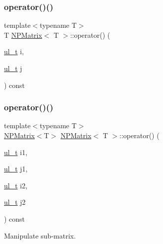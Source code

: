 \subsubsection{\texorpdfstring{operator()()}{operator()()}\hspace{0.1cm}{\footnotesize\ttfamily [2/4]}}
{\footnotesize\ttfamily template$<$typename T$>$ \\
T \mbox{\hyperlink{class_n_p_matrix}{N\+P\+Matrix}}$<$ T $>$\+::operator() (\begin{DoxyParamCaption}\item[{\mbox{\hyperlink{typedef_8h_a1b140a2034db3f5dfe18a987745df43a}{ul\+\_\+t}}}]{i,  }\item[{\mbox{\hyperlink{typedef_8h_a1b140a2034db3f5dfe18a987745df43a}{ul\+\_\+t}}}]{j }\end{DoxyParamCaption}) const\hspace{0.3cm}{\ttfamily [inline]}}

\mbox{\label{class_n_p_matrix_ab99139270be6ffff19fdf3b5765f321c}} 
\subsubsection{\texorpdfstring{operator()()}{operator()()}\hspace{0.1cm}{\footnotesize\ttfamily [3/4]}}
{\footnotesize\ttfamily template$<$typename T$>$ \\
\mbox{\hyperlink{class_n_p_matrix}{N\+P\+Matrix}}$<$T$>$ \mbox{\hyperlink{class_n_p_matrix}{N\+P\+Matrix}}$<$ T $>$\+::operator() (\begin{DoxyParamCaption}\item[{\mbox{\hyperlink{typedef_8h_a1b140a2034db3f5dfe18a987745df43a}{ul\+\_\+t}}}]{i1,  }\item[{\mbox{\hyperlink{typedef_8h_a1b140a2034db3f5dfe18a987745df43a}{ul\+\_\+t}}}]{j1,  }\item[{\mbox{\hyperlink{typedef_8h_a1b140a2034db3f5dfe18a987745df43a}{ul\+\_\+t}}}]{i2,  }\item[{\mbox{\hyperlink{typedef_8h_a1b140a2034db3f5dfe18a987745df43a}{ul\+\_\+t}}}]{j2 }\end{DoxyParamCaption}) const\hspace{0.3cm}{\ttfamily [inline]}}



Manipulate sub-\/matrix. 


